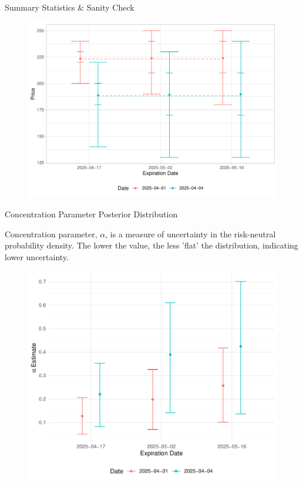 \documentclass[10pt,aspectratio=43]{beamer}
\begin{document}
\begin{frame}{Summary Statistics \& Sanity Check}
    \begin{figure}\centering
        \begin{minipage}{0.9\linewidth}
            \includegraphics[width=\linewidth]{summaries_plot.pdf}
        \end{minipage}
    \end{figure}
\end{frame}


\begin{frame}{Concentration Parameter Posterior Distribution}

    Concentration parameter, $\alpha$, is a measure of uncertainty in the risk-neutral probability density. The lower the value, the less 'flat' the distribution, indicating lower uncertainty.

    \begin{figure}\centering 
        \begin{minipage}{0.7\linewidth}
            \includegraphics[width=\textwidth]{alphas.pdf}
        \end{minipage}
    \end{figure}
\end{frame}
\end{document}
